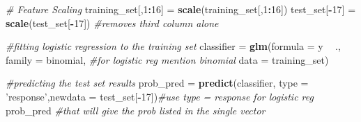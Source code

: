 \documentclass[
]{article}
\newenvironment{Shaded}{\begin{snugshade}}{\end{snugshade}}
\newcommand{\CommentTok}[1]{\textcolor[rgb]{0.56,0.35,0.01}{\textit{#1}}}
\newcommand{\DataTypeTok}[1]{\textcolor[rgb]{0.13,0.29,0.53}{#1}}
\newcommand{\DecValTok}[1]{\textcolor[rgb]{0.00,0.00,0.81}{#1}}
\newcommand{\KeywordTok}[1]{\textcolor[rgb]{0.13,0.29,0.53}{\textbf{#1}}}
\newcommand{\NormalTok}[1]{#1}
\newcommand{\OperatorTok}[1]{\textcolor[rgb]{0.81,0.36,0.00}{\textbf{#1}}}
\newcommand{\StringTok}[1]{\textcolor[rgb]{0.31,0.60,0.02}{#1}}
\begin{document}
\begin{Shaded}
\begin{Highlighting}[]
\CommentTok{# Feature Scaling}
\NormalTok{training_set[,}\DecValTok{1}\OperatorTok{:}\DecValTok{16}\NormalTok{] =}\StringTok{ }\KeywordTok{scale}\NormalTok{(training_set[,}\DecValTok{1}\OperatorTok{:}\DecValTok{16}\NormalTok{])}
\NormalTok{test_set[}\OperatorTok{-}\DecValTok{17}\NormalTok{] =}\StringTok{ }\KeywordTok{scale}\NormalTok{(test_set[}\OperatorTok{-}\DecValTok{17}\NormalTok{]) }\CommentTok{#removes third column alone}

\CommentTok{#fitting logistic regression to the training set}
\NormalTok{classifier =}\StringTok{ }\KeywordTok{glm}\NormalTok{(}\DataTypeTok{formula =}\NormalTok{ y }\OperatorTok{~}\StringTok{ }\NormalTok{.,}
                 \DataTypeTok{family =}\NormalTok{ binomial, }\CommentTok{#for logistic reg mention binomial}
                 \DataTypeTok{data =}\NormalTok{ training_set)}

\CommentTok{#predicting the test set results}
\NormalTok{prob_pred =}\StringTok{ }\KeywordTok{predict}\NormalTok{(classifier, }\DataTypeTok{type =} \StringTok{'response'}\NormalTok{,}\DataTypeTok{newdata =}\NormalTok{ test_set[}\OperatorTok{-}\DecValTok{17}\NormalTok{])}\CommentTok{#use type = response for logistic reg}
\NormalTok{prob_pred                                                          }\CommentTok{#that will give the prob listed in the single vector}
\end{Highlighting}
\end{Shaded}
\end{document}
